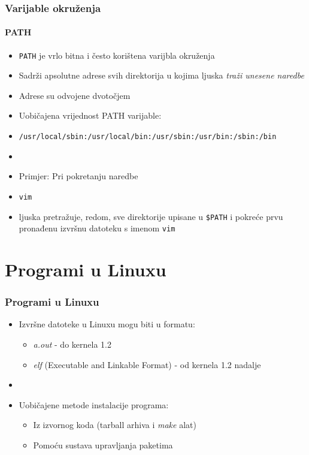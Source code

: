 \documentclass[table,usenames,dvipsnames]{beamer}
\newcommand{\shell}[1]{\texttt{#1}}
\begin{document}
\begin{frame}[t]
	\frametitle{Varijable okruženja}
	\framesubtitle{PATH}
	\begin{itemize}
		\item \shell{PATH} je vrlo bitna i često korištena varijbla okruženja
		\item Sadrži apsolutne adrese svih direktorija u kojima ljuska \emph{traži unesene naredbe}
		\item Adrese su odvojene dvotočjem
		\item Uobičajena vrijednost PATH varijable:
		\item[]	\small \shell{/usr/local/sbin:/usr/local/bin:/usr/sbin:/usr/bin:/sbin:/bin}
		\item[]
		\item Primjer: Pri pokretanju naredbe
		\item[] \shell{vim}
		\item[] ljuska pretražuje, redom, sve direktorije upisane u \shell{\$PATH} i pokreće prvu pronađenu izvršnu datoteku s imenom \shell{vim}
	\end{itemize}
\end{frame}

\section{Programi u Linuxu}
\begin{frame}[t]
	\frametitle{Programi u Linuxu}
	\begin{itemize}
		\item Izvršne datoteke u Linuxu mogu biti u formatu:
		\begin{itemize}
			\item \emph{a.out} - do kernela 1.2
			\item \emph{elf} (Executable and Linkable Format) - od kernela 1.2 nadalje
		\end{itemize}
		\item[]
		\item Uobičajene metode instalacije programa:
		\begin{itemize}
			\item Iz izvornog koda (tarball arhiva i \emph{make} alat)
			\item Pomoću sustava upravljanja paketima
		\end{itemize}
	\end{itemize}
\end{frame}
\end{document}
